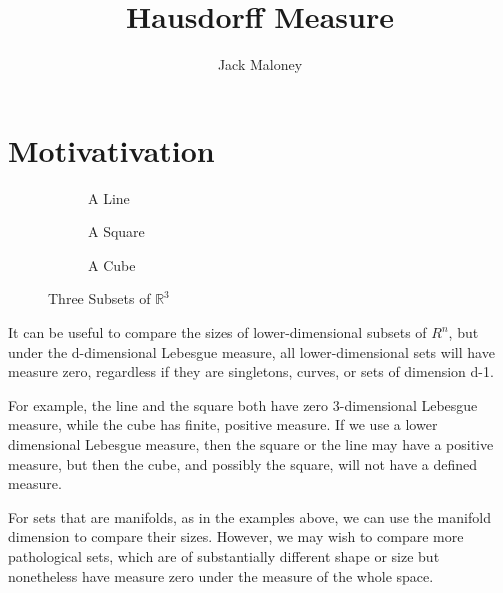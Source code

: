 \documentclass[11pt]{amsart}
\title{Hausdorff Measure %
}
\author{Jack Maloney}
\theoremstyle{definition}
\newcommand{\R}{\ensuremath{\mathbb{R}}}
\begin{document}
\maketitle

\section{Motivativation}

\begin{figure}[h]
	\begin{subfigure}{.3\textwidth}
	  	\centering
		\caption{A Line}
	\end{subfigure}
	\begin{subfigure}{.3\textwidth}
		\centering
		\caption{A Square}
	\end{subfigure}
	\begin{subfigure}{.3\textwidth}
		\centering
		\caption{A Cube}
	\end{subfigure}
	\caption{Three Subsets of \(\R^3\)}
\end{figure}

It can be useful to compare the sizes of lower-dimensional subsets of \( R^n \), but under the d-dimensional Lebesgue measure, all lower-dimensional sets will have measure zero, regardless if they are singletons, curves, or sets of dimension d-1. 

For example, the line and the square both have zero 3-dimensional Lebesgue measure, while the cube has finite, positive measure. If we use a lower dimensional Lebesgue measure, then the square or the line may have a positive measure, but then the cube, and possibly the square, will not have a defined measure.

For sets that are manifolds, as in the examples above, we can use the manifold dimension to compare their sizes. However, we may wish to compare more pathological sets, which are of substantially different shape or size but nonetheless have measure zero under the measure of the whole space.
\end{document}

